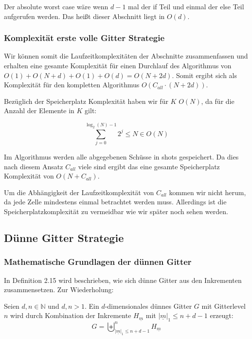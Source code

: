 \documentclass[a4paper,12pt]{llncs}
\numberwithin{equation}{section}
\begin{document}
Der absolute worst case wäre wenn $d-1$ mal der if Teil und einmal der else Teil aufgerufen werden. Das heißt dieser Abschnitt liegt in $O(d)$.

\subsubsection{Komplexität erste volle Gitter Strategie}

Wir können somit die Laufzeitkomplexitäten der Abschnitte zusammenfassen und erhalten eine gesamte Komplexität für einen Durchlauf des Algorithmus von $O(1)+O(N+d)+O(1)+O(d)=O(N+2d)$. Somit ergibt sich als Komplexität für den kompletten Algorithmus $O(C_{all}\cdot (N+2d))$.


Bezüglich der Speicherplatz Komplexität haben wir für $K$ $O(N)$, da für die Anzahl der Elemente in $K$ gilt:

\begin{equation}
\sum_{j=0}^{\log_2(N)-1}2^j\leq N \in O\left(N\right)
\end{equation}


Im Algorithmus werden alle abgegebenen Schüsse in shots gespeichert. Da dies nach diesem Ansatz $C_{all}$ viele sind ergibt das eine gesamte Speicherplatz Komplexität von $O(N+C_{all})$.

Um die Abhängigkeit der Laufzeitkomplexität von $C_{all}$ kommen wir nicht herum, da jede Zelle mindestens einmal betrachtet werden muss. Allerdings ist die Speicherplatzkomplexität zu vermeidbar wie wir später noch sehen werden. 


\subsection{Dünne Gitter Strategie}

\subsubsection{Mathematische Grundlagen der dünnen Gitter}

In \cite{M13} Definition 2.15 wird beschrieben, wie sich dünne Gitter aus den Inkrementen zusammensetzen. Zur Wiederholung:

\begin{definition}
	Seien $d,n\in\mathbb{N}$ und $d,n>1$. Ein $d$-dimensionales dünnes Gitter $G$ mit Gitterlevel $n$ wird durch Kombination der Inkremente $H_{\underline{m}}$ mit $|\underline{m}|_1\leq n+d-1$ erzeugt:
	\begin{equation}
	G=\biguplus_{|\underline{m}|_1\leq n+d-1}^n H_{\underline{m}}
	\end{equation}
\end{definition}
\end{document}
